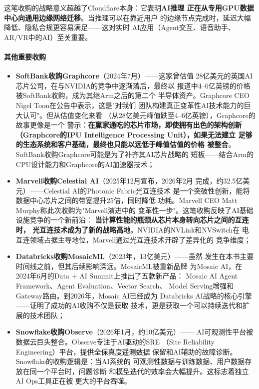 这笔收购的战略意义超越了Cloudflare本身：它表明\textbf{AI推理
正在从专用GPU数据中心向通用边缘网络迁移}。当推理可以在靠近用户
的边缘节点完成时，延迟大幅降低、隐私合规更容易满足——这对实时
AI应用（Agent交互、语音助手、AR/VR中的AI）至关重要。

\paragraph{其他重要收购}

\begin{itemize}
  \item \textbf{SoftBank收购Graphcore}（2024年7月）——这家曾估值
    28亿美元的英国AI芯片公司，在与NVIDIA的竞争中逐渐落后，最终以
    报道中4--6亿英镑的价格被SoftBank收购，成为其继Arm之后的第二个
    半导体资产。Graphcore CEO Nigel Toon在公告中表示，这是"对我们
    团队构建真正变革性AI技术能力的巨大认可"。但从估值变化来看
    （从28亿美元峰值跌至4--6亿英镑），Graphcore的故事更像是一个
    警示：\textbf{在赢家通吃的芯片市场，即使拥有出色的架构创新
    （Graphcore的IPU Intelligence Processing Unit），如果无法建立
    足够的生态系统和客户基础，最终也只能以远低于峰值估值的价格
    被整合}。SoftBank收购Graphcore可能是为了补齐其AI芯片战略的
    短板——结合Arm的CPU设计能力和Graphcore的AI加速器技术；

  \item \textbf{Marvell收购Celestial AI}（2025年12月宣布，2026年2月
    完成，约32.5亿美元）——Celestial AI的Photonic Fabric光互连技术
    是一个突破性创新，能将数据中心芯片之间的带宽提升25倍，同时降低
    功耗。Marvell CEO Matt Murphy称此次收购为"Marvell演进中的
    变革性一步"。这笔收购反映了AI基础设施竞争的一个新前沿：
    \textbf{当计算性能的瓶颈从芯片本身转向芯片之间的互连时，
    光互连技术成为了新的战略高地}。NVIDIA的NVLink和NVSwitch在
    电互连领域占据主导地位，Marvell通过光互连技术开辟了差异化的
    竞争维度；

  \item \textbf{Databricks收购MosaicML}（2023年，13亿美元）——虽然
    发生在本书主要时间线之前，但其后续影响深远。MosaicML被重新品牌
    为Mosaic AI，在2024年6月的Data + AI Summit上推出了五款新产品：
    Mosaic AI Agent Framework、Agent Evaluation、Vector Search、
    Model Serving增强和Gateway路由。到2026年，Mosaic AI已经成为
    Databricks AI战略的核心引擎——证明了成功的AI收购不仅是获取
    技术，更是获取一个可以持续迭代和扩展的技术团队；

  \item \textbf{Snowflake收购Observe}（2026年1月，约10亿美元）——
    AI可观测性平台被数据云巨头整合。Observe专注于AI驱动的SRE
   （Site Reliability Engineering）平台，提供全保真度遥测数据
    保留和AI辅助的故障诊断。Snowflake的收购逻辑是：当AI系统的
    可观测性数据与训练数据、用户数据存放在同一个平台时，问题诊断
    和模型迭代的效率会大幅提升。这标志着独立AI Ops工具正在被
    更大的平台吞噬。
\end{itemize}


